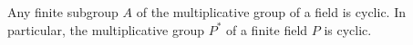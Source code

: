 Any finite subgroup $A$ of the multiplicative group of a field is cyclic. In particular, the multiplicative group $P^*$ of a finite field $P$ is cyclic.
